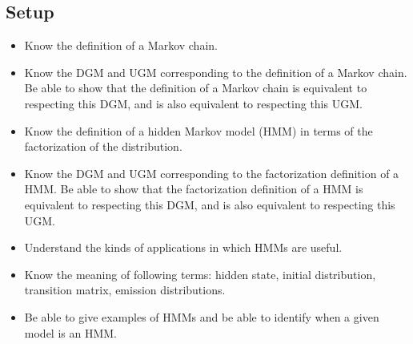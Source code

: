 \documentclass[12pt]{article}
\begin{document}
\subsection{Setup}
\begin{itemize}
\item Know the definition of a Markov chain.
\item Know the DGM and UGM corresponding to the definition of a Markov chain. Be able to show that the definition of a Markov chain is equivalent to respecting this DGM, and is also equivalent to respecting this UGM.
\item Know the definition of a hidden Markov model (HMM) in terms of the factorization of the distribution.
\item Know the DGM and UGM corresponding to the factorization definition of a HMM. Be able to show that the factorization definition of a HMM is equivalent to respecting this DGM, and is also equivalent to respecting this UGM.
\item Understand the kinds of applications in which HMMs are useful.
\item Know the meaning of following terms: hidden state, initial distribution, transition matrix, emission distributions.
\item Be able to give examples of HMMs and be able to identify when a given model is an HMM.
\end{itemize}
\end{document}
